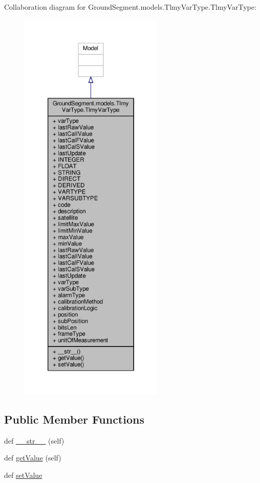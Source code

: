 Collaboration diagram for Ground\+Segment.\+models.\+Tlmy\+Var\+Type.\+Tlmy\+Var\+Type\+:\nopagebreak
\begin{figure}[H]
\begin{center}
\leavevmode
\includegraphics[height=550pt]{class_ground_segment_1_1models_1_1_tlmy_var_type_1_1_tlmy_var_type__coll__graph}
\end{center}
\end{figure}
\subsection*{Public Member Functions}
\begin{DoxyCompactItemize}
\item 
def \hyperlink{class_ground_segment_1_1models_1_1_tlmy_var_type_1_1_tlmy_var_type_ada8f03c46e8d44e5325d8b1e146761ce}{\+\_\+\+\_\+str\+\_\+\+\_\+} (self)
\item 
def \hyperlink{class_ground_segment_1_1models_1_1_tlmy_var_type_1_1_tlmy_var_type_a2e95f578edd5b376c3f4798900bbb3cf}{get\+Value} (self)
\item 
def \hyperlink{class_ground_segment_1_1models_1_1_tlmy_var_type_1_1_tlmy_var_type_aa035c709edd4f261ad5ca70be85636a3}{set\+Value}
\end{DoxyCompactItemize}
